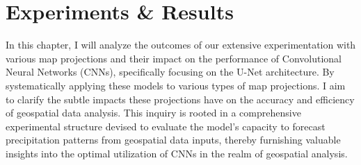 
\clearpage
\cleardoublepage

\chapter{Experiments \& Results}

\label{chap:experiments_results}

In this chapter, I will analyze the outcomes of our extensive experimentation with various map projections and their impact on the performance
of Convolutional Neural Networks (CNNs), specifically focusing on the U-Net architecture. By systematically applying these models to various types of
map projections. I aim to clarify the subtle impacts these projections have on the accuracy and efficiency of
geospatial data analysis. This inquiry is rooted in a comprehensive experimental structure devised to evaluate the model's capacity to forecast precipitation patterns
from geospatial data inputs, thereby furnishing valuable insights into the optimal utilization of CNNs in the realm of geospatial analysis.





